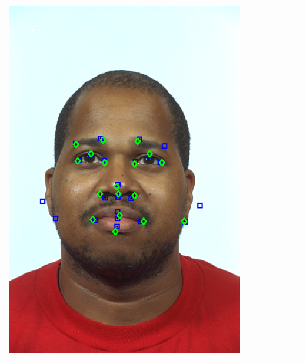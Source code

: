 \documentclass[landscape,final,a0paper,fontscale=0.27065]{baposter}
\begin{document}
\begin{poster}
{{\begin{tabular}{@{}rccccccc@{}}
 \parbox[c]{0.11\linewidth}{\includegraphics[width=\linewidth]{images/l_fb_success_2.pdf}} &

\end{tabular}}}
\end{poster}
\end{document}

